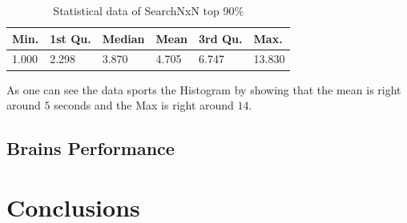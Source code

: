 \documentclass[letterpaper]{article}
\begin{document}
\begin{table}[h]
\begin{tabular}{|l|l|l|l|l|l|}
\hline
Min. & 1st Qu.  & Median & Mean & 3rd Qu. & Max.\\
\hline
1.000 & 2.298 & 3.870 & 4.705 & 6.747 & 13.830\\
\hline
\end{tabular}
\caption{Statistical data of SearchNxN top 90\%}
\label{tab:SearchNxNTab2}
\end{table}

As one can see the data sports the Histogram by showing that the mean is right around $5$ seconds and the Max is right around $14$.

\subsection{Brains Performance}

\section{Conclusions}
\end{document}
